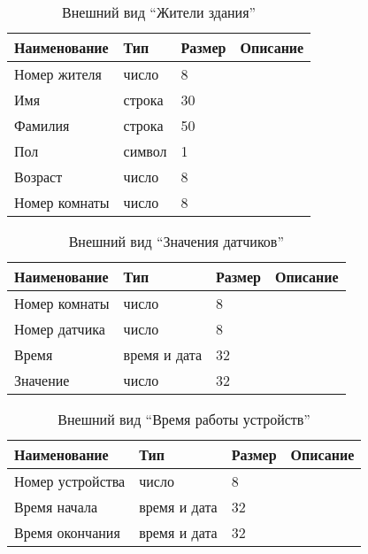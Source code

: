           \begin{table}[h!]
            \centering
            \caption{Внешний вид “Жители здания”}
            \label{sensor:size}
            \begin{tabular}{|l|l|l|l|}
            \hline
            Наименование & Тип & Размер & Описание \\ \hline
            Номер жителя & число & 8 & \\ \hline
            Имя & строка & 30 & \\ \hline
            Фамилия & строка & 50 & \\ \hline
            Пол & символ & 1 & \\ \hline
            Возраст & число & 8 & \\ \hline
            Номер комнаты & число & 8 & \\ \hline
            \end{tabular}
          \end{table}
          \begin{table}[h!]
            \centering
            \caption{Внешний вид “Значения датчиков”}
            \label{room:size}
            \begin{tabular}{|l|l|l|l|}
            \hline
            Наименование & Тип & Размер & Описание \\ \hline
            Номер комнаты & число & 8 & \\ \hline
            Номер датчика & число & 8 & \\ \hline
            Время & время и дата & 32 & \\ \hline
            Значение & число & 32 & \\ \hline
            \end{tabular}
          \end{table}
          \begin{table}[h!]
            \centering
            \caption{Внешний вид “Время работы устройств”}
            \label{room:size}
            \begin{tabular}{|l|l|l|l|}
            \hline
            Наименование & Тип & Размер & Описание \\ \hline
            Номер устройства & число & 8 & \\ \hline
            Время начала & время и дата & 32 &          \\ \hline
            Время окончания & время и дата & 32 &          \\ \hline
            \end{tabular}
          \end{table}
